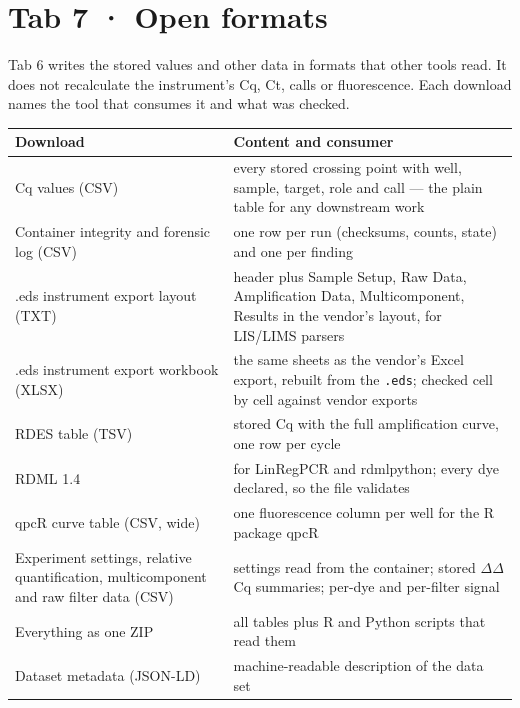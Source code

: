 \chapter{Tab 7 · Open formats}\label{ch:values}

Tab 6 writes the stored values and other data in formats that other tools read. It does not recalculate the instrument's Cq,
Ct, calls or fluorescence. Each download names the tool that consumes it and what was checked.

\begin{center}\small
\begin{tabular}{@{}p{4.3cm}p{10.9cm}@{}}\toprule
Download & Content and consumer\\\midrule
Cq values (CSV) & every stored crossing point with well, sample, target, role and call — the plain table for any downstream work\\
Container integrity and forensic log (CSV) & one row per run (checksums, counts, state) and one per finding\\
.eds instrument export layout (TXT) & header plus Sample Setup, Raw Data, Amplification Data, Multicomponent, Results in the vendor's layout, for LIS/LIMS parsers\\
.eds instrument export workbook (XLSX) & the same sheets as the vendor's Excel export, rebuilt from the \texttt{.eds}; checked cell by cell against vendor exports\\
RDES table (TSV) & stored Cq with the full amplification curve, one row per cycle\\
RDML 1.4 & for LinRegPCR and rdmlpython; every dye declared, so the file validates\\
qpcR curve table (CSV, wide) & one fluorescence column per well for the R package qpcR\\
Experiment settings, relative quantification, multicomponent and raw filter data (CSV) & settings read from the container; stored $\Delta\Delta$Cq summaries; per-dye and per-filter signal\\
Everything as one ZIP & all tables plus R and Python scripts that read them\\
Dataset metadata (JSON-LD) & machine-readable description of the data set\\\bottomrule
\end{tabular}
\end{center}

